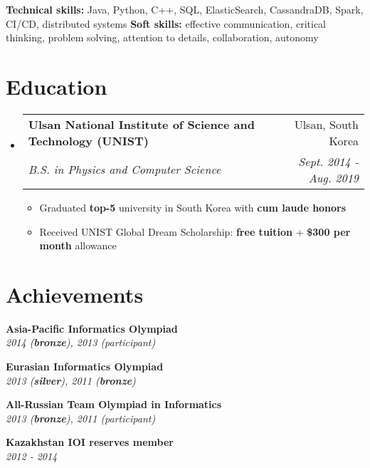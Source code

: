 \documentclass[letterpaper,11pt]{article}
\makeatletter
\newcommand{\resumeItem}[1]{
    \item\small{
            {#1 \vspace{-2pt}}
    }
}
\newcommand{\resumeSubheading}[4]{
    \vspace{-2pt}\item
    \begin{tabular*}{0.97\textwidth}[t]{l@{\extracolsep{\fill}}r}
    \textbf{#1} & #2 \\
    \textit{\small#3} & \textit{\small #4} \\
    \end{tabular*}\vspace{-7pt}
}
\newcommand{\resumeSubHeadingListStart}{\begin{itemize}[leftmargin=0.15in, label={}]}
\newcommand{\resumeSubHeadingListEnd}{\end{itemize}}
\newcommand{\resumeItemListStart}{\begin{itemize}}
\newcommand{\resumeItemListEnd}{\end{itemize}\vspace{-5pt}}
\makeatother
\begin{document}
\hspace*{7pt}
\small{\textbf{Technical skills:} Java, Python, C++, SQL, ElasticSearch, CassandraDB, Spark, CI/CD, distributed systems}
\newline
\hspace*{8pt}
\small{\textbf{Soft skills:} effective communication, critical thinking, problem solving, attention to details, collaboration, autonomy}

\section{Education}
\resumeSubHeadingListStart
\resumeSubheading
{Ulsan National Institute of Science and Technology (UNIST)}{Ulsan, South Korea}
{B.S. in Physics and Computer Science}{Sept. 2014 - Aug. 2019}
\resumeItemListStart
\resumeItem{Graduated \textbf{top-5} university in South Korea with \textbf{cum laude honors}}
\resumeItem{Received UNIST Global Dream Scholarship: \textbf{free tuition} + \textbf{\$300 per month} allowance}
\resumeItemListEnd
\resumeSubHeadingListEnd

\section{Achievements}
\parbox[t]{0.45\textwidth}{
    \begin{itemize}[leftmargin=0.15in, label={}]

    \vspace{-12pt}
    \small{\item{
    \textbf{Asia-Pacific Informatics Olympiad} \\
    \textit{2014 (\textbf{bronze}), 2013 (participant)} \\
    }}

    \vspace{-15pt}
    \small{\item{
    \textbf{Eurasian Informatics Olympiad} \\
    \textit{2013 (\textbf{silver}), 2011 (\textbf{bronze})} \\
    }}

    \end{itemize}
}
\parbox[t]{0.45\textwidth}{
    \begin{itemize}[leftmargin=0.15in, label={}]

        \vspace{-12pt}
        \small{\item{
        \textbf{All-Russian Team Olympiad in Informatics} \\
        \textit{2013 (\textbf{bronze}), 2011 (participant)} \\
        }}

        \vspace{-15pt}
        \small{\item{
        \textbf{Kazakhstan IOI reserves member} \\
        \textit{2012 - 2014} \\
        }}

    \end{itemize}
}

\end{document}
